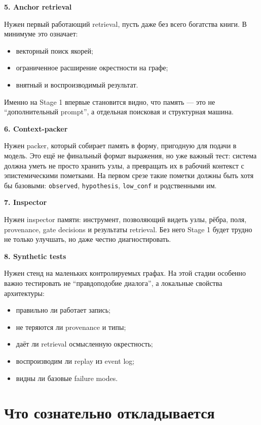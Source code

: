 \textbf{5. Anchor retrieval}

Нужен первый работающий retrieval, пусть даже без всего богатства книги. В
минимуме это означает:

\begin{itemize}\itemsep2pt
\item векторный поиск якорей;
\item ограниченное расширение окрестности на графе;
\item внятный и воспроизводимый результат.
\end{itemize}

Именно на Stage 1 впервые становится видно, что память --- это не
``дополнительный prompt'', а отдельная поисковая и структурная машина.

\textbf{6. Context-packer}

Нужен packer, который собирает память в форму, пригодную для подачи в модель.
Это ещё не финальный формат выражения, но уже важный тест: система должна
уметь не просто хранить узлы, а превращать их в рабочий контекст с
эпистемическими пометками. На первом срезе такие пометки должны быть хотя бы
базовыми: \texttt{observed}, \texttt{hypothesis}, \texttt{low\_conf} и
родственными им.

\textbf{7. Inspector}

Нужен inspector памяти: инструмент, позволяющий видеть узлы, рёбра, поля,
provenance, gate decisions и результаты retrieval. Без него Stage 1 будет
трудно не только улучшать, но даже честно диагностировать.

\textbf{8. Synthetic tests}

Нужен стенд на маленьких контролируемых графах. На этой стадии особенно
важно тестировать не ``правдоподобие диалога'', а локальные свойства
архитектуры:

\begin{itemize}\itemsep2pt
\item правильно ли работает запись;
\item не теряются ли provenance и типы;
\item даёт ли retrieval осмысленную окрестность;
\item воспроизводим ли replay из event log;
\item видны ли базовые failure modes.
\end{itemize}

\section{Что сознательно откладывается}

